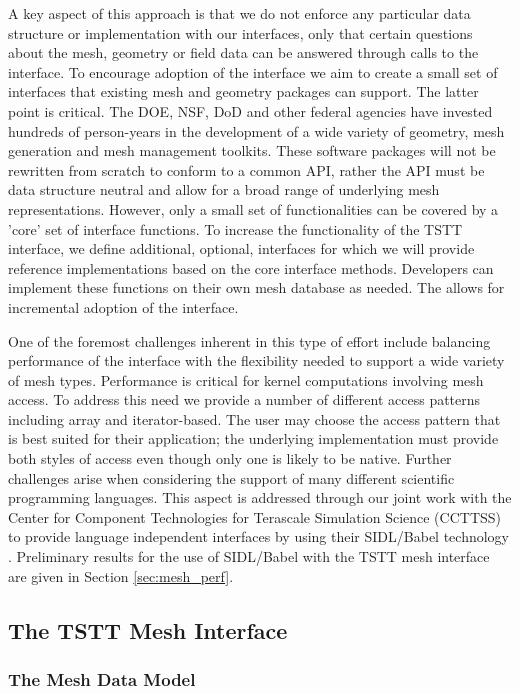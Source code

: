 A key aspect of this approach is that we do not enforce any particular
data structure or implementation with our interfaces, only that
certain questions about the mesh, geometry or field data can be
answered through calls to the interface.  To encourage adoption of the
interface we aim to create a small set of interfaces that existing
mesh and geometry packages can support.  The latter point is critical.
The DOE, NSF, DoD and other federal agencies have invested hundreds of
person-years in the development of a wide variety of geometry, mesh
generation and mesh management toolkits.  These software packages will
not be rewritten from scratch to conform to a common API, rather the
API must be data structure neutral and allow for a broad range of
underlying mesh representations. However, only a small set of
functionalities can be covered by a 'core' set of interface functions.
To increase the functionality of the TSTT interface, we define
additional, optional, interfaces for which we will provide reference
implementations based on the core interface methods.  Developers can
implement these functions on their own mesh database as needed.
The allows for incremental adoption of the interface.

One of the foremost challenges inherent in this type of effort include
balancing performance of the interface with the flexibility needed to
support a wide variety of mesh types.  Performance is critical for
kernel computations involving mesh access.  To address this need we
provide a number of different access patterns including array and
iterator-based.  The user may choose the access pattern that is best
suited for their application; the underlying implementation must
provide both styles of access even though only one is likely to be
native.  Further challenges arise when considering the support of many
different scientific programming languages.  This aspect is addressed
through our joint work with the Center for Component Technologies for
Terascale Simulation Science (CCTTSS) \cite{cca-forum} to provide
language independent interfaces by using their SIDL/Babel technology
\cite{babel}.  Preliminary results for the use of SIDL/Babel with
the TSTT mesh interface are given in Section \ref{sec:mesh_perf}.

\subsection{The TSTT Mesh Interface}

\subsubsection{The Mesh Data Model}
\label{sec:mesh}

